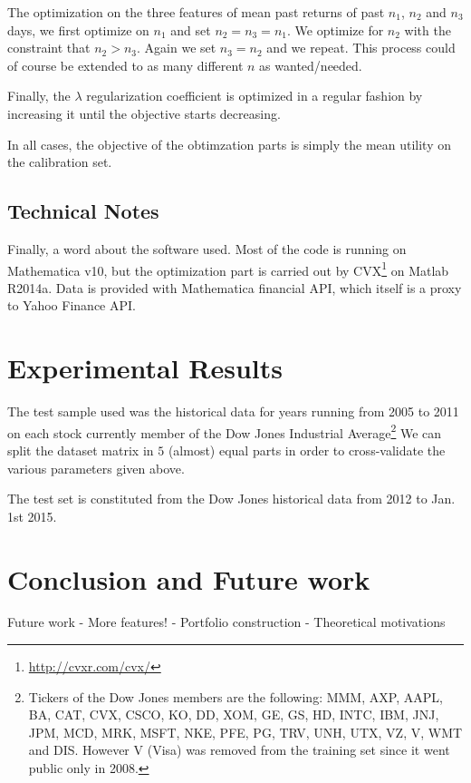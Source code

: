\documentclass[11pt,fleqn]{article}
\begin{document}
The optimization on the three features of mean past returns of past $n_1$, $n_2$ and $n_3$
days, we first optimize on $n_1$ and set $n_2=n_3=n_1$. We optimize for $n_2$ with the
constraint that $n_2>n_3$. Again we set $n_3=n_2$ and we repeat. This process could of
course be extended to as many different $n$ as wanted/needed. 

Finally, the $\lambda$ regularization coefficient is optimized in a regular fashion by
increasing it until the objective starts decreasing. 

In all cases, the objective of the obtimzation parts is simply the mean utility on the
calibration set.



\subsection{Technical Notes}

Finally, a word about the software used. Most of the code is running on Mathematica v10,
but the optimization part is carried out by CVX\footnote{\url{http://cvxr.com/cvx/}} on
Matlab R2014a. Data is provided with Mathematica financial API, which itself is a proxy to
Yahoo Finance API. 


\section{Experimental Results}

The test sample used was the historical data for years running from 2005 to 2011 on each
stock currently member of the Dow Jones Industrial Average\footnote{Tickers of the Dow
  Jones members are the following: MMM, AXP, AAPL, BA, CAT, CVX, CSCO, KO, DD, XOM, GE,
  GS, HD, INTC, IBM, JNJ, JPM, MCD, MRK, MSFT, NKE, PFE, PG, TRV, UNH, UTX, VZ, V, WMT and
  DIS.  However V (Visa) was removed from the training set since it went public only in
  2008.} We can split the dataset matrix in $5$ (almost) equal parts in order to
cross-validate the various parameters given above. 

The test set is constituted from the Dow Jones historical data from 2012 to Jan. 1st
2015. 

\section{Conclusion and Future work}

Future work
 - More features!
 - Portfolio construction
 - Theoretical motivations
\end{document}
